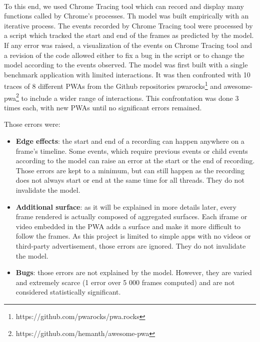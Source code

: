 \documentclass{kththesis}
\begin{document}
    \paragraph{}
    To this end, we used Chrome Tracing tool which can record and display many functions called by Chrome's processes. Th model was built empirically with an iterative process. The events recorded by Chrome Tracing tool were processed by a script which tracked the start and end of the frames as predicted by the model. If any error was raised, a visualization of the events on Chrome Tracing tool and a revision of the code allowed either to fix a bug in the script or to change the model according to the events observed. \newline
    The model was first built with a single benchmark application with limited interactions. It was then confronted with 10 traces of 8 different PWAs from the Github repositories pwarocks\footnote{https://github.com/pwarocks/pwa.rocks} and awesome-pwa\footnote{https://github.com/hemanth/awesome-pwa} to include a wider range of interactions. This confrontation was done 3 times each, with new PWAs until no significant errors remained.
    
    Those errors were:
    \begin{itemize}
        \item \textbf{Edge effects}: the start and end of a recording can happen anywhere on a frame's timeline. Some events, which require previous events or child events according to the model can raise an error at the start or the end of recording. Those errors are kept to a minimum, but can still happen as the recording does not always start or end at the same time for all threads. They do not invalidate the model.
        \item \textbf{Additional surface}: as it will be explained in more details later, every frame rendered is actually composed of aggregated surfaces. Each iframe or video embedded in the PWA adds a surface and make it more difficult to follow the frames. As this project is limited to simple apps with no videos or third-party advertisement, those errors are ignored. They do not invalidate the model.
        \item \textbf{Bugs}: those errors are not explained by the model. However, they are varied and extremely scarce (1 error over 5 000 frames computed) and are not considered statistically significant.
    \end{itemize}
    
\end{document}
